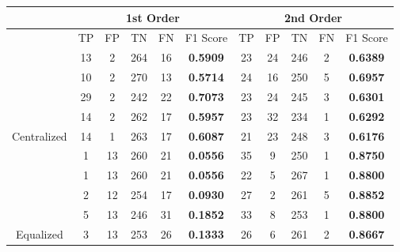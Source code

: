 \documentclass[10pt,a4paper]{article}
\begin{document}
		\begin{table}[!h]
			\centering
			\begin{tabular}{|c|c|c|c|c|c|c|c|c|c|c|}
				\hline
				& \multicolumn{5}{c|}{1st Order}                                                     & \multicolumn{5}{c|}{2nd Order}                              \\ \hline
				& TP & FP & TN  & FN                        & F1 Score                               & TP & FP & TN  & FN & F1 Score                               \\ \hline
				& 13 & 2  & 264 & {\color[HTML]{333333} 16} & {\color[HTML]{FE0000} \textbf{0.5909}} & 23 & 24 & 246 & 2  & {\color[HTML]{FE0000} \textbf{0.6389}} \\ \cline{2-11} 
				& 10 & 2  & 270 & {\color[HTML]{333333} 13} & {\color[HTML]{FE0000} \textbf{0.5714}} & 24 & 16 & 250 & 5  & {\color[HTML]{FE0000} \textbf{0.6957}} \\ \cline{2-11} 
				& 29 & 2  & 242 & {\color[HTML]{333333} 22} & {\color[HTML]{FE0000} \textbf{0.7073}} & 23 & 24 & 245 & 3  & {\color[HTML]{FE0000} \textbf{0.6301}} \\ \cline{2-11} 
				& 14 & 2  & 262 & {\color[HTML]{333333} 17} & {\color[HTML]{FE0000} \textbf{0.5957}} & 23 & 32 & 234 & 1  & {\color[HTML]{FE0000} \textbf{0.6292}} \\ \cline{2-11} 
				\multirow{-5}{*}{Centralized} & 14 & 1  & 263 & {\color[HTML]{333333} 17} & {\color[HTML]{FE0000} \textbf{0.6087}} & 21 & 23 & 248 & 3  & {\color[HTML]{FE0000} \textbf{0.6176}} \\ \hline
				& 1  & 13 & 260 & {\color[HTML]{333333} 21} & {\color[HTML]{FE0000} \textbf{0.0556}} & 35 & 9  & 250 & 1  & {\color[HTML]{FE0000} \textbf{0.8750}} \\ \cline{2-11} 
				& 1  & 13 & 260 & {\color[HTML]{333333} 21} & {\color[HTML]{FE0000} \textbf{0.0556}} & 22 & 5  & 267 & 1  & {\color[HTML]{FE0000} \textbf{0.8800}} \\ \cline{2-11} 
				& 2  & 12 & 254 & {\color[HTML]{333333} 17} & {\color[HTML]{FE0000} \textbf{0.0930}} & 27 & 2  & 261 & 5  & {\color[HTML]{FE0000} \textbf{0.8852}} \\ \cline{2-11} 
				& 5  & 13 & 246 & {\color[HTML]{333333} 31} & {\color[HTML]{FE0000} \textbf{0.1852}} & 33 & 8  & 253 & 1  & {\color[HTML]{FE0000} \textbf{0.8800}}  \\ \cline{2-11} 
				\multirow{-5}{*}{Equalized}   & 3  & 13 & 253 & {\color[HTML]{333333} 26} & {\color[HTML]{FE0000} \textbf{0.1333}} & 26 & 6  & 261 & 2  & {\color[HTML]{FE0000} \textbf{0.8667}} \\ \hline
			\end{tabular}
		\end{table}
	
\end{document}
